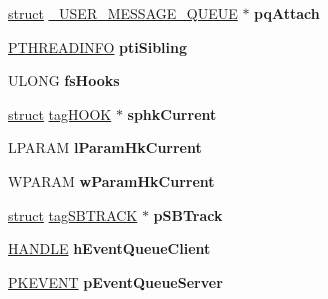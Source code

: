 \begin{DoxyCompactItemize}
\item 
\mbox{\label{struct___t_h_r_e_a_d_i_n_f_o_a0430fcac2a1a5bbfd5761f345deb8808}} 
\hyperlink{interfacestruct}{struct} \hyperlink{struct___u_s_e_r___m_e_s_s_a_g_e___q_u_e_u_e}{\+\_\+\+U\+S\+E\+R\+\_\+\+M\+E\+S\+S\+A\+G\+E\+\_\+\+Q\+U\+E\+UE} $\ast$ {\bfseries pq\+Attach}
\item 
\mbox{\label{struct___t_h_r_e_a_d_i_n_f_o_a1c2eb9296e9ab80ce3156fc6c7514304}} 
\hyperlink{struct___t_h_r_e_a_d_i_n_f_o}{P\+T\+H\+R\+E\+A\+D\+I\+N\+FO} {\bfseries pti\+Sibling}
\item 
\mbox{\label{struct___t_h_r_e_a_d_i_n_f_o_a2e41b00fdc32dd21cd39845721b27dc9}} 
U\+L\+O\+NG {\bfseries fs\+Hooks}
\item 
\mbox{\label{struct___t_h_r_e_a_d_i_n_f_o_a2696a073c5eed04a70aecbd433a74643}} 
\hyperlink{interfacestruct}{struct} \hyperlink{structtag_h_o_o_k}{tag\+H\+O\+OK} $\ast$ {\bfseries sphk\+Current}
\item 
\mbox{\label{struct___t_h_r_e_a_d_i_n_f_o_a412a9f213924d0a943ef02aff8a150b5}} 
L\+P\+A\+R\+AM {\bfseries l\+Param\+Hk\+Current}
\item 
\mbox{\label{struct___t_h_r_e_a_d_i_n_f_o_a1c4900950e638c367c226780cc886366}} 
W\+P\+A\+R\+AM {\bfseries w\+Param\+Hk\+Current}
\item 
\mbox{\label{struct___t_h_r_e_a_d_i_n_f_o_ada9622c2498431d2fd84f21f77eac437}} 
\hyperlink{interfacestruct}{struct} \hyperlink{structtag_s_b_t_r_a_c_k}{tag\+S\+B\+T\+R\+A\+CK} $\ast$ {\bfseries p\+S\+B\+Track}
\item 
\mbox{\label{struct___t_h_r_e_a_d_i_n_f_o_aabe4e15732384315243666e1cb6b662d}} 
\hyperlink{interfacevoid}{H\+A\+N\+D\+LE} {\bfseries h\+Event\+Queue\+Client}
\item 
\mbox{\label{struct___t_h_r_e_a_d_i_n_f_o_a794945098fffeb1463a5a335502804e4}} 
\hyperlink{struct___k_e_v_e_n_t}{P\+K\+E\+V\+E\+NT} {\bfseries p\+Event\+Queue\+Server}

\end{DoxyCompactItemize}

